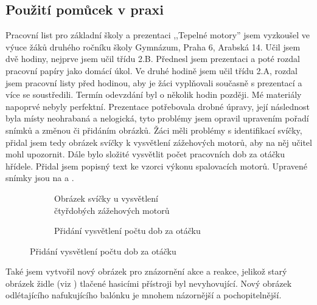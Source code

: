\subsection{Použití pomůcek v praxi}\label{sc:pouzitiVPraxi}
{Pracovní list pro základní školy a prezentaci ,,Tepelné motory'' jsem vyzkoušel ve výuce žáků druhého ročníku školy Gymnázum, Praha 6, Arabská 14. Učil jsem dvě hodiny, nejprve jsem učil třídu 2.B. Přednesl jsem prezentaci a poté rozdal pracovní papíry jako domácí úkol. Ve druhé hodině jsem učil třídu 2.A, rozdal jsem pracovní listy před hodinou, aby je žáci vyplňovali současně s prezentací a více se soustředili. Termín odevzdání byl o několik hodin později.}\odst
{Mé materiály napoprvé nebyly perfektní. Prezentace potřebovala drobné úpravy, její následnost byla místy neohrabaná a nelogická, tyto problémy jsem opravil upravením pořadí snímků a změnou či přidáním obrázků.}\odst
{Žáci měli problémy s identifikací svíčky, přidal jsem tedy obrázek svíčky k vysvětlení zážehových motorů, aby na něj učitel mohl upozornit. Dále bylo složité vysvětlit počet pracovních dob za otáčku hřídele. Přidal jsem popisný text ke vzorci výkonu spalovacích motorů. Upravené snímky jsou na  a .}
\begin{figure}[H]
    \begingroup
    \makeatletter
    \renewcommand\thesubfigure{\thefigure~--~\@nameuse{subfiglabel@\alph{subfigure}}}
    \newcommand{\subfiglabel@a}{vlevo}
    \newcommand{\subfiglabel@b}{vpravo}
    \captionsetup[subfigure]{labelformat=simple, labelsep=colon}
    \renewcommand\p@subfigure{}
    \makeatother
    \begin{subfigure}{0.47\textwidth}
        \centering
        \setlength{\fboxsep}{0pt}
        \caption{Obrázek svíčky u vysvětlení\\čtyřdobých zážehových motorů \jaObr}
        \label{obr:svickaSlide}
    \end{subfigure}\hfill
    \begin{subfigure}{0.47\textwidth}
        \centering
        \setlength{\fboxsep}{0pt}
        \caption{Přidání vysvětlení počtu dob za otáčku \jaObr}
        \label{obr:vzorceSlide}
    \end{subfigure}
    \endgroup
\end{figure}
{Také jsem vytvořil nový obrázek pro znázornění akce a reakce, jelikož starý obrázek židle (viz ) tlačené hasicími přístroji byl nevyhovující. Nový obrázek  odlétajícího nafukujícího balónku je mnohem názornější a pochopitelnější.}
